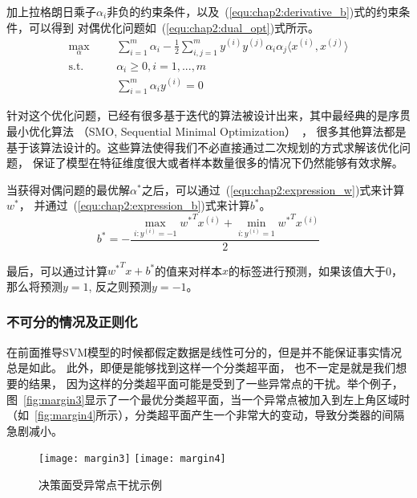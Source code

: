 加上拉格朗日乘子$\alpha_i$非负的约束条件，以及~(\ref{equ:chap2:derivative_b})式的约束条件，可以得到
对偶优化问题如~(\ref{equ:chap2:dual_opt})式所示。
\begin{equation}
  \label{equ:chap2:dual_opt}
  \begin{aligned}
    \max_{\alpha} &
    & & \sum_{i=1}^m\alpha_i-\frac{1}{2}\sum_{i,j=1}^m
    y^{(i)}y^{(j)}\alpha_i\alpha_j\langle x^{(i)},x^{(j)}\rangle\\
    \text{s.t.} &
    & & \alpha_i\geq 0, i=1,...,m \\
    \quad &
    & & \sum_{i=1}^m\alpha_iy^{(i)}=0
  \end{aligned}
\end{equation}

针对这个优化问题，已经有很多基于迭代的算法被设计出来，其中最经典的是序贯最小优化算法
（SMO, Sequential Minimal Optimization）~\cite{platt1998sequential}，
很多其他算法都是基于该算法设计的。这些算法使得我们不必直接通过二次规划的方式求解该优化问题，
保证了模型在特征维度很大或者样本数量很多的情况下仍然能够有效求解。

当获得对偶问题的最优解$\alpha^*$之后，可以通过~(\ref{equ:chap2:expression_w})式来计算$w^*$，
并通过~(\ref{equ:chap2:expression_b})式来计算$b^*$。
\begin{equation}
  \label{equ:chap2:expression_b}
  b^*=-\frac{\max_{i:y^{(i)}=-1}{w^*}^Tx^{(i)}+\min_{i:y^{(i)}=1}{w^*}^Tx^{(i)}}{2}
\end{equation}

最后，可以通过计算${w^*}^Tx+b^*$的值来对样本$x$的标签进行预测，如果该值大于0，那么将预测$y=1$,
反之则预测$y=-1$。

\subsubsection{不可分的情况及正则化}

在前面推导SVM模型的时候都假定数据是线性可分的，但是并不能保证事实情况总是如此。
此外，即便是能够找到这样一个分类超平面， 也不一定是就是我们想要的结果，
因为这样的分类超平面可能是受到了一些异常点的干扰。举个例子，
图~\ref{fig:margin3}显示了一个最优分类超平面，当一个异常点被加入到左上角区域时
（如~\ref{fig:margin4}所示），分类超平面产生一个非常大的变动，导致分类器的间隔急剧减小。
\begin{figure}[ht]
  \centering%
  {\texttt{[image: margin3]}}%
  \hspace{6em}%
  {\texttt{[image: margin4]}}
  \caption{决策面受异常点干扰示例}
  \label{fig:margin3+4}
\end{figure}

